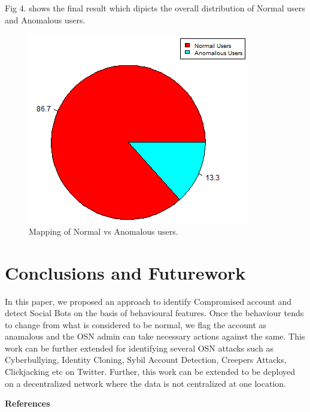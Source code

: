 \documentclass[conference]{IEEEtran}
\begin{document}
Fig 4. shows the final result which dipicts the overall distribution of Normal users and Anomalous users.

\begin{figure}[h!]
  \includegraphics[scale=0.7]{pieChart1}
  \caption{ Mapping of Normal vs Anomalous users.}
\end{figure}

\section{Conclusions and Futurework}

In this paper, we proposed an approach to identify Compromised account and detect Social Bots on the basis of behavioural features. 
Once the behaviour tends to change from what is considered to be normal, we flag the account as anamalous and the OSN admin can 
take necessary actions against the same. 
This work can be further extended for identifying several OSN attacks such as Cyberbullying, Identity Cloning, 
Sybil Account Detection, Creepers Attacks, Clickjacking etc on Twitter. Further, this work can be extended to 
be deployed on a decentralized network where the data is not centralized at one location.

\begin{center}
\textbf{References}
\end{center}
\end{document}
